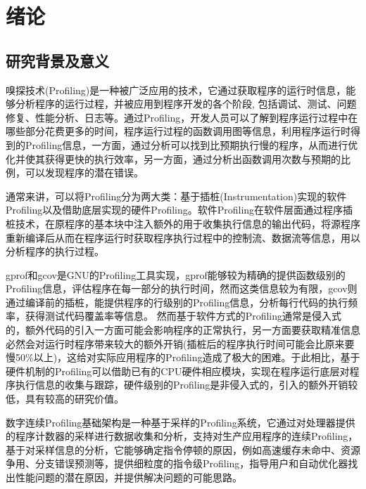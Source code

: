 
\chapter{绪论}

\section{研究背景及意义}

嗅探技术(Profiling)是一种被广泛应用的技术，它通过获取程序的运行时信息，能够分析程序的运行过程，并被应用到程序开发的各个阶段, 包括调试、测试、问题修复、性能分析、日志等。通过Profiling，开发人员可以了解到程序运行过程中在哪些部分花费更多的时间，程序运行过程的函数调用图等信息，利用程序运行时得到的Profiling信息，一方面，通过分析可以找到比预期执行慢的程序，从而进行优化并使其获得更快的执行效率，另一方面，通过分析出函数调用次数与预期的比例，可以发现程序的潜在错误。

通常来讲，可以将Profiling分为两大类：基于插桩(Instrumentation)实现的软件Profiling以及借助底层实现的硬件Profiling。软件Profiling在软件层面通过程序插桩技术，在原程序的基本块中注入额外的用于收集执行信息的输出代码，将源程序重新编译后从而在程序运行时获取程序执行过程中的控制流、数据流等信息，用以分析程序的执行过程。

gprof和gcov是GNU的Profiling工具实现，gprof能够较为精确的提供函数级别的Profiling信息，评估程序在每一部分的执行时间，然而这类信息较为有限，gcov则通过编译前的插桩，能提供程序的行级别的Profiling信息，分析每行代码的执行频率，获得测试代码覆盖率等信息。
然而基于软件方式的Profiling通常是侵入式的，额外代码的引入一方面可能会影响程序的正常执行，另一方面要获取精准信息必然会对运行时程序带来较大的额外开销(插桩后的程序执行时间可能会比原来要慢50\%以上)，这给对实际应用程序的Profiling造成了极大的困难。于此相比，基于硬件机制的Profiling可以借助已有的CPU硬件相应模块，实现在程序运行底层对程序执行信息的收集与跟踪，硬件级别的Profiling是非侵入式的，引入的额外开销较低，具有较高的研究价值。

数字连续Profiling基础架构是一种基于采样的Profiling系统，它通过对处理器提供的程序计数器的采样进行数据收集和分析，支持对生产应用程序的连续Profiling，基于对采样信息的分析，它能够确定指令停顿的原因，例如高速缓存未命中、资源争用、分支错误预测等，提供细粒度的指令级Profiling，指导用户和自动优化器找出性能问题的潜在原因，并提供解决问题的可能思路。 

